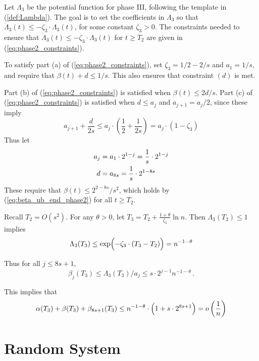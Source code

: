 \documentclass[a4paper,12pt]{article}
\begin{document}
Let $\Lambda_{3}$ be the potential function for phase III, following the template in (\ref{def:Lambda}). The goal is to set the coefficients in $\Lambda_{3}$ so that $\dot{\Lambda}_{3}(t) \leq -\zeta_{3} \cdot \Lambda_{3}(t)$, for some constant $\zeta_{3}> 0$.
The constraints needed to ensure that $\dot{{\Lambda}}_{3}(t) \leq - \zeta_{3} \cdot {\Lambda}_{3}(t)$ for $t \geq T_2$ are given in (\ref{eq:phase2_constraints}).

To satisfy part (a) of (\ref{eq:phase2_constraints}), set $\zeta_{3} = 1/2 - 2/s$ and ${a}_1 = 1/s$, and require that $\beta(t) + {d} \leq 1/s$. This also ensures that constraint $(d)$ is met.

\medskip

Part (b) of (\ref{eq:phase2_constraints}) is satisfied when $\beta(t) \leq 2 {d}/s$. Part (c) of (\ref{eq:phase2_constraints}) is satisfied when $ {d} \leq  {a}_j$ and $ {a}_{j+1} =  {a}_j/2$, since these imply
$$
{a}_{j+1} + \frac{ {d}}{2s} \leq  {a}_j \cdot \left( \frac{1}{2} + \frac{1}{2s} \right) =  {a}_j \cdot (1 - \zeta_{3})
$$
Thus let
\begin{align}
{a}_j & =  {a}_1 \cdot 2^{1-j} = \frac{1}{s} \cdot 2^{1-j} \notag \\
 {d} & = {a}_{8s} = \frac{1}{s} \cdot 2^{1-8s} \notag \\
\end{align}
These require that $\beta(t) \leq 2^{2-8s}/s^2$, which holds by (\ref{eq:beta_ub_end_phase2}) for all $t \geq T_2$.

\medskip

Recall $T_2 = O(s^2)$. For any $\theta > 0$, let $T_3 = T_2 + \frac{1 + \theta}{\zeta_{3}} \ln{n}$. Then $\Lambda_{3}(T_2) \leq 1$ implies
\begin{align}
\Lambda_{3}(T_3) \leq \exp \Bigl( -\zeta_{3} \cdot (T_3 - T_2) \Bigr) = n^{-1 - \theta}
\end{align}

Thus for all $j \leq 8s+1$,
$$\beta_j(T_3) \leq \Lambda_{3}(T_3) /  {a}_j \leq s \cdot  2^{j-1} n^{-1 - \theta}\,.$$

This implies that
\begin{align}
\alpha(T_3) + \beta(T_3) + \beta_{8s+1}(T_3) \leq n^{-1-\theta} \cdot \Bigl( 1 + s \cdot 2^{8s+1} \Bigr) = o\left(\frac{1}{n}\right)
\end{align}

\section{Random System}
\end{document}
